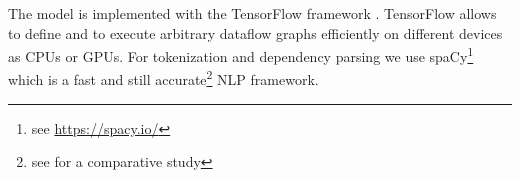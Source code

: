 The model is implemented with the TensorFlow framework  \autocite{abadi_tensorflow:_2016}. TensorFlow allows to define and to execute arbitrary dataflow graphs efficiently on different devices as CPUs or GPUs. For tokenization and dependency parsing we use spaCy\footnote{see \url{https://spacy.io/}} which is a fast and still accurate\footnote{see \textcite{choi_it_2015} for a comparative study} \ac{NLP} framework. 






